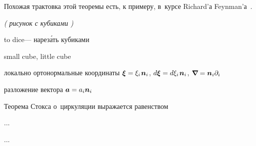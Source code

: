 \begin{otherlanguage}{russian}
Похожая трактовка этой теоремы есть, к примеру, в~курсе Richard’а Feynman’а~\cite{feynman-lecturesonphysics}.

\emph{( рисунок с кубиками )}

to dice\:--- нарез\'{а}ть кубиками

small cube, little cube

локально ортонормальные координаты ${\bm{\xi} = \xi_i \hspace{.2ex} \bm{n}_i \hspace{.1ex}}$, ${d\bm{\xi} = d \xi_i \hspace{.2ex} \bm{n}_i}$, ${\bm{\nabla}\hspace{-0.2ex} = \bm{n}_i \partial_i}$

разложение вектора ${\bm{a} = a_i \bm{n}_i \hspace{.1ex}}$

Теорема Стокса о~циркуляции выражается равенством

...

\newpage ...



\end{otherlanguage}

